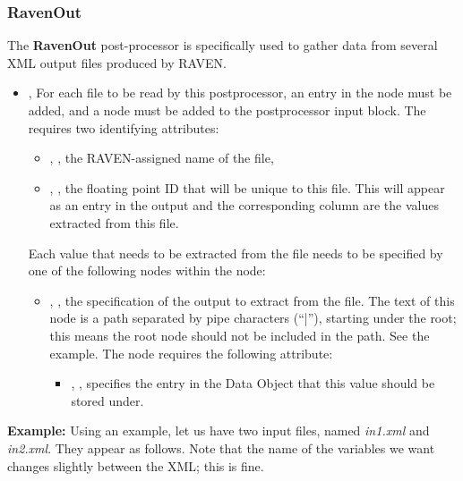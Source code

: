 \subsubsection{RavenOut}
\label{RavenOut}
The \textbf{RavenOut} post-processor is specifically used
to gather data from several XML output files produced by RAVEN.
%
%
\begin{itemize}
  \item {}, 
  For each file to be read by this postprocessor, an entry in the  node must be added, and a
   node must be added to the postprocessor input block.  The  requires two
  identifying attributes:
  \begin{itemize}
    \item {}, , the RAVEN-assigned name of the file,
    \item {}, , the floating point ID that will be unique to this
      file.  This will appear as an entry in the output  and the corresponding column are
      the values extracted from this file.
  \end{itemize}
  Each value that needs to be extracted from the file needs to be specified by one of the following
   nodes within the  node:
  \begin{itemize}
    \item {}, ,
           the specification of the output to extract from the file.  The text of this node is a path
           separated by pipe characters (``|''), starting under the root; this means the root node should not
           be included in the path. See the example.
           The  node requires the following attribute:
      \begin{itemize}
        \item {}, , specifies the entry in the Data Object that
          this value should be stored under.
      \end{itemize}

  \end{itemize}
\end{itemize}
\textbf{Example:}
Using an example, let us have two input files, named \emph{in1.xml} and \emph{in2.xml}.  They appear as
follows.  Note that the name of the variables we want changes slightly between the XML; this is fine.

